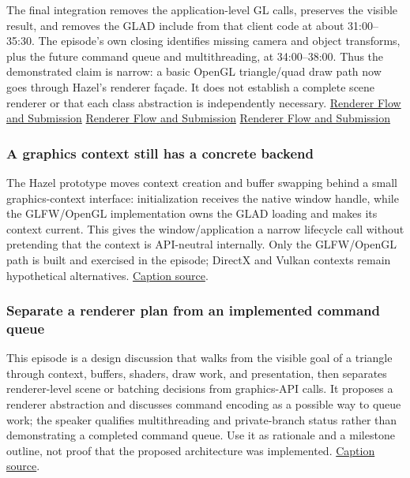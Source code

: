 The final integration removes the application-level GL calls, preserves the visible result, and removes the GLAD include from that client code at about 31:00--35:30. The episode's own closing identifies missing camera and object transforms, plus the future command queue and multithreading, at 34:00--38:00. Thus the demonstrated claim is narrow: a basic OpenGL triangle/quad draw path now goes through Hazel's renderer façade. It does not establish a complete scene renderer or that each class abstraction is independently necessary. \href{https://www.youtube.com/watch?v=akxevYYWd9g&t=1860s}{Renderer Flow and Submission} \href{https://www.youtube.com/watch?v=akxevYYWd9g&t=2040s}{Renderer Flow and Submission} \href{https://www.youtube.com/watch?v=akxevYYWd9g&t=2220s}{Renderer Flow and Submission}

\subsubsection{A graphics context still has a concrete backend}\label{06-engine-ii-ch025-a-graphics-context-still-has-a-concrete-backend}

The Hazel prototype moves context creation and buffer swapping behind a small graphics-context interface: initialization receives the native window handle, while the GLFW/OpenGL implementation owns the GLAD loading and makes its context current. This gives the window/application a narrow lifecycle call without pretending that the context is API-neutral internally. Only the GLFW/OpenGL path is built and exercised in the episode; DirectX and Vulkan contexts remain hypothetical alternatives. \href{https://www.youtube.com/watch?v=YZKEjaCnsjU}{Caption source}.

\subsubsection{Separate a renderer plan from an implemented command queue}\label{06-engine-ii-ch025-separate-a-renderer-plan-from-an-implemented-command-queue}

This episode is a design discussion that walks from the visible goal of a triangle through context, buffers, shaders, draw work, and presentation, then separates renderer-level scene or batching decisions from graphics-API calls. It proposes a renderer abstraction and discusses command encoding as a possible way to queue work; the speaker qualifies multithreading and private-branch status rather than demonstrating a completed command queue. Use it as rationale and a milestone outline, not proof that the proposed architecture was implemented. \href{https://www.youtube.com/watch?v=Hoi-Gzk-How}{Caption source}.

